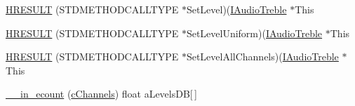\begin{DoxyCompactItemize}
\hyperlink{struct_i_audio_treble_vtbl_a4317b17811de2d3dc73d44156d57d01f}{H\+R\+E\+S\+U\+LT} (S\+T\+D\+M\+E\+T\+H\+O\+D\+C\+A\+L\+L\+T\+Y\+PE $\ast$Set\+Level)(\hyperlink{devicetopology_8h_a3ef1bf2f271f0005c3cb93c9d81d3f80}{I\+Audio\+Treble} $\ast$This
\item 
\hyperlink{struct_i_audio_treble_vtbl_a83741213486802b390a1ca49b801168a}{H\+R\+E\+S\+U\+LT} (S\+T\+D\+M\+E\+T\+H\+O\+D\+C\+A\+L\+L\+T\+Y\+PE $\ast$Set\+Level\+Uniform)(\hyperlink{devicetopology_8h_a3ef1bf2f271f0005c3cb93c9d81d3f80}{I\+Audio\+Treble} $\ast$This
\item 
\hyperlink{struct_i_audio_treble_vtbl_a668aeddc1c2e6723a73c89193f59c34d}{H\+R\+E\+S\+U\+LT} (S\+T\+D\+M\+E\+T\+H\+O\+D\+C\+A\+L\+L\+T\+Y\+PE $\ast$Set\+Level\+All\+Channels)(\hyperlink{devicetopology_8h_a3ef1bf2f271f0005c3cb93c9d81d3f80}{I\+Audio\+Treble} $\ast$This
\item 
\hyperlink{struct_i_audio_treble_vtbl_a8841193ebdaa3ae4548eb5f03166458e}{\+\_\+\+\_\+in\+\_\+ecount} (\hyperlink{struct_i_audio_treble_vtbl_ac3ce4a6cdea005ff1dc767c886451589}{c\+Channels}) float a\+Levels\+DB\mbox{[}$\,$\mbox{]}
\end{DoxyCompactItemize}
